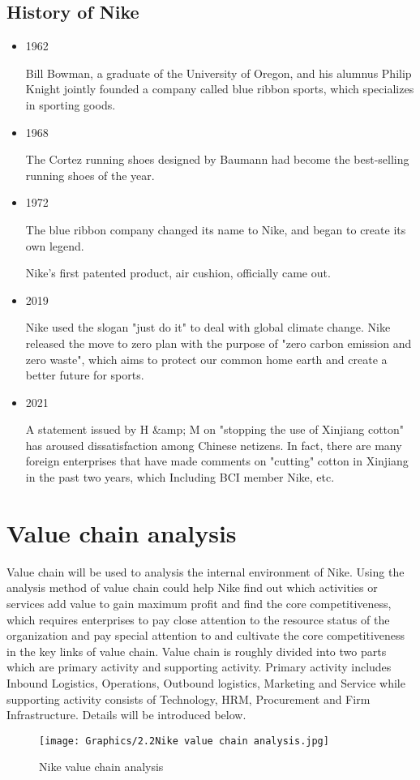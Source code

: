 \documentclass[a4paper, 12pt]{report}
\begin{document}
\subsection{History of Nike}
\begin{itemize}
    \item 1962\par
    Bill Bowman, a graduate of the University of Oregon, and his alumnus Philip Knight jointly founded a company called blue ribbon sports, which specializes in sporting goods.
    \item 1968\par
    The Cortez running shoes designed by Baumann had become the best-selling running shoes of the year.
    \item 1972\par
    The blue ribbon company changed its name to Nike, and began to create its own legend. \par
    Nike's first patented product, air cushion, officially came out.
    \item 2019\par
    Nike used the slogan "just do it" to deal with global climate change. Nike released the move to zero plan with the purpose of "zero carbon emission and zero waste", which aims to protect our common home earth and create a better future for sports.
    \item 2021\par
    A statement issued by H &amp; M on "stopping the use of Xinjiang cotton" has aroused dissatisfaction among Chinese netizens. In fact, there are many foreign enterprises that have made comments on "cutting" cotton in Xinjiang in the past two years, which Including BCI member Nike, etc.
\end{itemize}

\section{Value chain analysis}
Value chain will be used to analysis the internal environment of Nike. Using the analysis method of value chain could help Nike find out which activities or services add value to gain maximum profit and find the core competitiveness, which requires enterprises to pay close attention to the resource status of the organization and pay special attention to and cultivate the core competitiveness in the key links of value chain. Value chain is roughly divided into two parts which are primary activity and supporting activity. Primary activity includes Inbound Logistics, Operations, Outbound logistics, Marketing and Service while supporting activity consists of Technology, HRM, Procurement and Firm Infrastructure. Details will be introduced below.
 \begin{figure}[ht]
 			\begin{center}
				\texttt{[image: Graphics/2.2Nike value chain analysis.jpg]} 
			\end{center}
       		\caption{\label{2.2}Nike value chain analysis}
 \end{figure}
\end{document}
